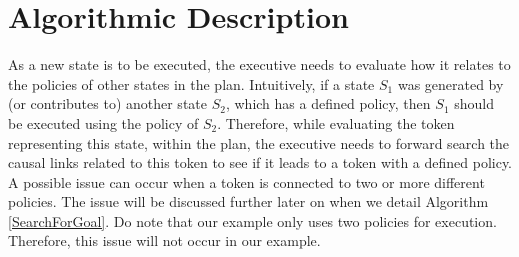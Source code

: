 %
%
%
%
%


\section{Algorithmic Description}
\label{sec:algo}

As a new state is to be executed, the executive needs
to evaluate how it relates to the policies of other states in the plan. Intuitively, if
a state $S_1$ was generated by (or contributes to) another state $S_2$, which has a defined policy, then
$S_1$ should be executed using the policy of $S_2$. Therefore, while
evaluating the token representing this state, within the plan, the
executive needs to forward search the causal links related to this
token to see if it leads to a token with a defined policy. A possible issue can occur 
when a token is connected to two or more different policies. The issue will be
discussed further later on when we detail Algorithm \ref{SearchForGoal}. Do
note that our example only uses two policies for execution.
Therefore, this issue will not occur in our example.



